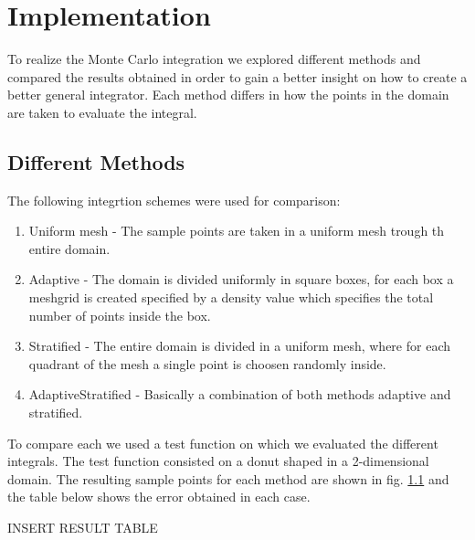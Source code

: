 \section{Implementation}

To realize the Monte Carlo integration we explored different methods and compared the results obtained
in order to gain a better insight on how to create a better general integrator. Each method differs in how
the points in the domain are taken to evaluate the integral.

\subsection{Different Methods}

The following integrtion schemes \cite{MCmethods} were used for comparison:
\begin{enumerate}
  \item Uniform mesh - The sample points are taken in a uniform mesh trough th entire domain.
  \item Adaptive - The domain is divided uniformly in square boxes, for each box a meshgrid is created
  specified by a density value which specifies the total number of points inside the box.
  \item Stratified - The entire domain is divided in a uniform mesh, where for each quadrant of the mesh
  a single point is choosen randomly inside.
  \item AdaptiveStratified - Basically a combination of both methods adaptive and stratified.
\end{enumerate}

To compare each we used a test function on which we evaluated the different integrals.
The test function consisted on a donut shaped  in a 2-dimensional domain. The resulting
sample points for each method are shown in fig. \ref{} and the table below shows the error
obtained in each case.

INSERT RESULT TABLE
